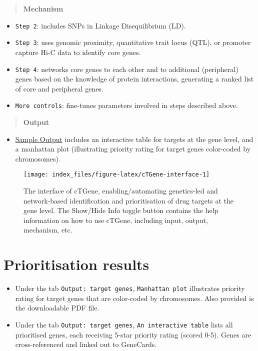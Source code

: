 \documentclass[
  oneside]{book}
\providecommand{\tightlist}{%
  \setlength{\itemsep}{0pt}\setlength{\parskip}{0pt}}
\begin{document}
\begin{quote}
\textbf{Mechanism}
\end{quote}

\begin{itemize}
\item
  \texttt{Step\ 2}: includes SNPs in Linkage Disequilibrium (LD).
\item
  \texttt{Step\ 3}: uses genomic proximity, quantitative trait locus (QTL), or promoter capture Hi-C data to identify core genes.
\item
  \texttt{Step\ 4}: networks core genes to each other and to additional (peripheral) genes based on the knowledge of protein interactions, generating a ranked list of core and peripheral genes.
\item
  \texttt{More\ controls}: fine-tunes parameters involved in steps described above.
\end{itemize}

\begin{quote}
\textbf{Output}
\end{quote}

\begin{itemize}
\tightlist
\item
  \href{http://www.genetictargets.com/app/examples/_tmp_RMD_cTGene.html}{Sample Output} includes an interactive table for targets at the gene level, and a manhattan plot (illustrating priority rating for target genes color-coded by chromosomes).
\end{itemize}

\begin{figure}

{\centering \texttt{[image: index\_files/figure-latex/cTGene-interface-1]} 

}

\caption{The interface of cTGene, enabling/automating genetics-led and network-based identification and prioritisation of drug targets at the gene level. The Show/Hide Info toggle button contains the help information on how to use cTGene, including input, output, mechanism, etc.}\label{fig:cTGene-interface}
\end{figure}

\hypertarget{prioritisation-results}{%
\section{Prioritisation results}\label{prioritisation-results}}

\begin{itemize}
\item
  Under the tab \texttt{Output:\ target\ genes}, \texttt{Manhattan\ plot} illustrates priority rating for target genes that are color-coded by chromosomes. Also provided is the downloadable PDF file.
\item
  Under the tab \texttt{Output:\ target\ genes}, \texttt{An\ interactive\ table} lists all prioritised genes, each receiving 5-star priority rating (scored 0-5). Genes are cross-referenced and linked out to GeneCards.
\end{itemize}
\end{document}
